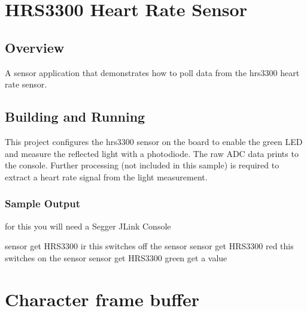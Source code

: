 \documentclass[letterpaper,10pt,english]{sphinxmanual}
\begin{document}
\section{HRS3300 Heart Rate Sensor}
\label{\detokenize{samples/README:hrs3300-heart-rate-sensor}}\label{\detokenize{samples/README:hrs3300}}\label{\detokenize{samples/README::doc}}

\subsection{Overview}
\label{\detokenize{samples/README:overview}}
A sensor application that demonstrates how to poll data from the hrs3300 heart
rate sensor.


\subsection{Building and Running}
\label{\detokenize{samples/README:building-and-running}}
This project configures the hrs3300 sensor on the  board to
enable the green LED and measure the reflected light with a photodiode. The raw
ADC data prints to the console. Further processing (not included in this
sample) is required to extract a heart rate signal from the light measurement.


\subsubsection{Sample Output}
\label{\detokenize{samples/README:sample-output}}
for this you will need a Segger JLink Console

\begin{sphinxVerbatim}[commandchars=\\\{\}]
 sensor get HRS3300  ir \PYGZhy{}\PYGZhy{} this switches off the sensor
 sensor get HRS3300  red \PYGZhy{}\PYGZhy{} this switches on the sensor
 sensor get HRS3300  green \PYGZhy{}\PYGZhy{} get a value
\end{sphinxVerbatim}


\section{Character frame buffer}
\label{\detokenize{samples/samplescfbREADME:character-frame-buffer}}\label{\detokenize{samples/samplescfbREADME:character-frame-buffer-sample}}\label{\detokenize{samples/samplescfbREADME::doc}}
\end{document}
